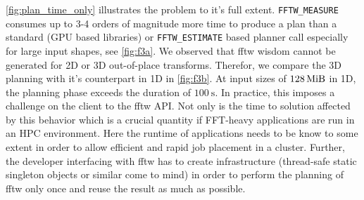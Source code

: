 \cref{fig:plan_time_only} illustrates the problem to it's full extent. \texttt{FFTW\_MEASURE} consumes up to 3-4 orders of magnitude more time to produce a plan than a standard (GPU based libraries) or \texttt{FFTW\_ESTIMATE} based planner call especially for large input shapes, see \cref{fig:f3a}. We observed that fftw wisdom cannot be generated for 2D or 3D out-of-place transforms. Therefor, we compare the 3D planning with it's counterpart in 1D in \cref{fig:f3b}. At input sizes of $\SI{128}{\mebi\byte}$ in 1D, the planning phase exceeds the duration of $\SI{100}{\s}$. In practice, this imposes a challenge on the client to the fftw API. Not only is the time to solution affected by this behavior which is a crucial quantity if FFT-heavy applications are run in an HPC environment. Here the runtime of applications needs to be know to some extent in order to allow efficient and rapid job placement in a cluster. Further, the developer interfacing with fftw has to create infrastructure (thread-safe static singleton objects or similar come to mind) in order to perform the planning of fftw only once and reuse the result as much as possible.



